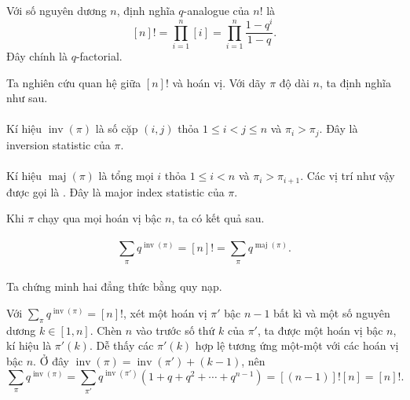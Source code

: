 \documentclass[11pt]{article}
\begin{document}
\paragraph{}
Với số nguyên dương \(n\), định nghĩa \(q\)-analogue của \(n!\) là
\[
  [n]!=\prod_{i=1}^{n}[i]
      =\prod_{i=1}^{n}\frac{1-q^i}{1-q}.
\]
Đây chính là \(q\)-factorial.

Ta nghiên cứu quan hệ giữa \([n]!\) và hoán vị. Với dãy \(\pi\) độ dài \(n\),
ta định nghĩa như sau.

\paragraph{}
Kí hiệu \(\operatorname{inv}(\pi)\) là số cặp \((i,j)\) thỏa
\(1\le i<j\le n\) và \(\pi_i>\pi_j\). Đây là inversion statistic của \(\pi\).

\paragraph{}
Kí hiệu \(\operatorname{maj}(\pi)\) là tổng mọi \(i\) thỏa
\(1\le i<n\) và \(\pi_i>\pi_{i+1}\). Các vị trí như vậy được gọi là
. Đây là major index statistic của \(\pi\).

Khi \(\pi\) chạy qua mọi hoán vị bậc \(n\), ta có kết quả sau.

\paragraph{}
\[
  \sum_{\pi} q^{\operatorname{inv}(\pi)}
  =[n]!
  =\sum_{\pi} q^{\operatorname{maj}(\pi)}.
\]

\paragraph{}
Ta chứng minh hai đẳng thức bằng quy nạp.

Với \(\sum_{\pi}q^{\operatorname{inv}(\pi)}=[n]!\), xét một hoán vị
\(\pi'\) bậc \(n-1\) bất kì và một số nguyên dương \(k\in[1,n]\). Chèn \(n\)
vào trước số thứ \(k\) của \(\pi'\), ta được một hoán vị bậc \(n\), kí hiệu là
\(\pi'(k)\). Dễ thấy các \(\pi'(k)\) hợp lệ tương ứng một-một với các hoán vị
bậc \(n\). Ở đây
\(\operatorname{inv}(\pi)=\operatorname{inv}(\pi')+(k-1)\), nên
\[
  \sum_{\pi}q^{\operatorname{inv}(\pi)}
  =\sum_{\pi'}q^{\operatorname{inv}(\pi')}
    (1+q+q^2+\cdots+q^{n-1})
  =[(n-1)]![n]=[n]!.
\]
\end{document}
